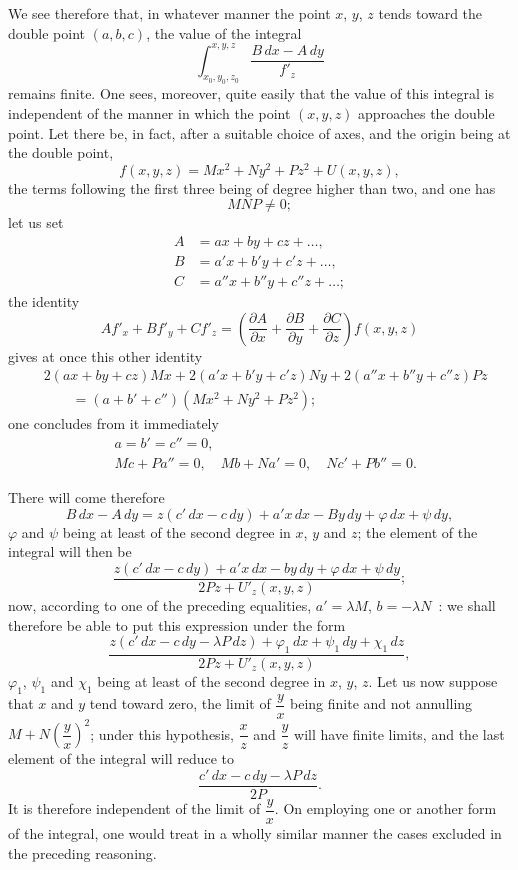 \documentclass{article}
\begin{document}
We see therefore that, in whatever manner the point $x$, $y$, $z$ tends toward the double point $(a, b, c)$, the value of the integral
\[
\int_{x_{0}, y_{0}, z_{0}}^{x, y, z} \frac{B\,dx - A\,dy}{f'_{z}}
\]
remains finite. One sees, moreover, quite easily that the value of this integral is independent of the manner in which the point $(x, y, z)$ approaches the double point. Let there be, in fact, after a suitable choice of axes, and the origin being at the double point,
\[
f(x, y, z) = Mx^{2} + Ny^{2} + Pz^{2} + U(x, y, z),
\]
the terms following the first three being of degree higher than two, and one has
\[
MNP \neq 0;
\]
let us set
\[
\begin{aligned}
A &= ax + by + cz + \ldots, \\
B &= a'x + b'y + c'z + \ldots, \\
C &= a''x + b''y + c''z + \ldots;
\end{aligned}
\]
the identity
\[
A f'_{x} + B f'_{y} + C f'_{z} = \left( \frac{\partial A}{\partial x} + \frac{\partial B}{\partial y} + \frac{\partial C}{\partial z} \right) f(x, y, z)
\]
gives at once this other identity
\[
\begin{aligned}
&2(ax + by + cz)Mx + 2(a'x + b'y + c'z)Ny + 2(a''x + b''y + c''z)Pz \\
&\qquad = (a + b' + c'')(Mx^{2} + Ny^{2} + Pz^{2});
\end{aligned}
\]
one concludes from it immediately
\[
\begin{aligned}
&a = b' = c'' = 0, \\
&Mc + Pa'' = 0, \quad Mb + Na' = 0, \quad Nc' + Pb'' = 0.
\end{aligned}
\]

There will come therefore
\[
B\,dx - A\,dy = z(c'\,dx - c\,dy) + a'x\,dx - By\,dy + \varphi\,dx + \psi\,dy,
\]
$\varphi$ and $\psi$ being at least of the second degree in $x$, $y$ and $z$; the element of the integral will then be
\[
\frac{z(c'\,dx - c\,dy) + a'x\,dx - by\,dy + \varphi\,dx + \psi\,dy}{2Pz + U'_{z}(x, y, z)};
\]
now, according to one of the preceding equalities, $a' = \lambda M$, $b = -\lambda N$~: we shall therefore be able to put this expression under the form
\[
\frac{z(c'\,dx - c\,dy - \lambda P\,dz) + \varphi_{1}\,dx + \psi_{1}\,dy + \chi_{1}\,dz}{2Pz + U'_{z}(x, y, z)},
\]
$\varphi_{1}$, $\psi_{1}$ and $\chi_{1}$ being at least of the second degree in $x$, $y$, $z$. Let us now suppose that $x$ and $y$ tend toward zero, the limit of $\dfrac{y}{x}$ being finite and not annulling $M + N\left(\dfrac{y}{x}\right)^{2}$; under this hypothesis, $\dfrac{x}{z}$ and $\dfrac{y}{z}$ will have finite limits, and the last element of the integral will reduce to
\[
\frac{c'\,dx - c\,dy - \lambda P\,dz}{2P}.
\]
It is therefore independent of the limit of $\dfrac{y}{x}$. On employing one or another form of the integral, one would treat in a wholly similar manner the cases excluded in the preceding reasoning.
\end{document}
